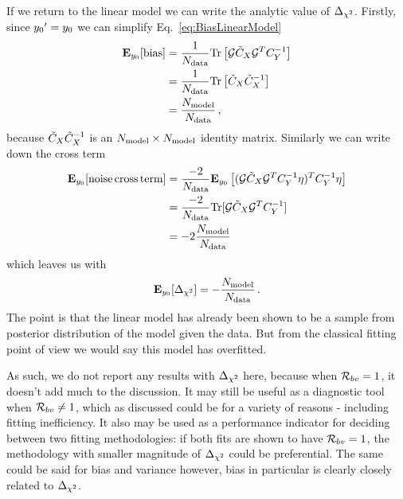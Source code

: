 If we return to the linear model we can write the analytic value of
$\Delta_{\chi^2}$. Firstly, since ${{y_0}^{\prime}}=y_0$ we can
simplify Eq.~\ref{eq:BiasLinearModel}
\begin{equation}\label{eq:BiasLinearModelSimple}
    \begin{split}
        \mathbf{E}_{y_0}[{\rm bias}] &= \frac{1}{N_{\rm data}}
            {\rm Tr} \left[
                \mathcal{G} \tilde{C}_X \mathcal{G}^T C_{Y}^{-1}
            \right] \\
            &= \frac{1}{N_{\rm data}}{\rm Tr} \left[ \tilde{C}_X \tilde{C}_X^{-1}\right] \\
            &= \frac{N_{\rm model}}{N_{\rm data}} \, ,
    \end{split}
\end{equation}
because $\tilde{C}_X \tilde{C}_X^{-1}$ is an $N_{\rm model} \times N_{\rm model}$ identity
matrix. Similarly we can write down the cross term
\begin{equation}
    \begin{split}
        \mathbf{E}_{y_0}[{\rm noise \, cross \, term}] &= \frac{-2}{N_{\rm data}} \mathbf{E}_{y_0} \left[
            (\mathcal{G} \tilde{C}_X \mathcal{G}^T C_{Y}^{-1} \eta)^T C_{Y}^{-1} \eta
        \right] \\
        &= \frac{-2}{N_{\rm data}}{\rm Tr} [\mathcal{G} \tilde{C}_X \mathcal{G}^T C_{Y}^{-1}] \\
        &= -2 \frac{N_{\rm model}}{N_{\rm data}}
    \end{split}
\end{equation}
which leaves us with
\begin{equation}
    \mathbf{E}_{y_0}[\Delta_{\chi^2}] = - \frac{N_{\rm model}}{N_{\rm data}} \, .
\end{equation}
The point is that the linear model has already been shown to be a sample from
posterior distribution of the model given the data. But from the classical
fitting point of view we would say this model has overfitted.

As such, we do not report any results with $\Delta_{\chi^2}$ here, because
when $\mathcal{R}_{bv} = 1$, it doesn't add much to the discussion. It may still
be useful as a diagnostic tool when $\mathcal{R}_{bv} \neq 1$, which as discussed
could be for a variety of reasons - including fitting inefficiency. It also
may be used as a performance indicator for deciding between two fitting
methodologies: if both fits are shown to have $\mathcal{R}_{bv} = 1$, the
methodology with smaller magnitude of $\Delta_{\chi^2}$ could be preferential.
The same could be said for bias and variance however, bias in particular is
clearly closely related to $\Delta_{\chi^2}$.
